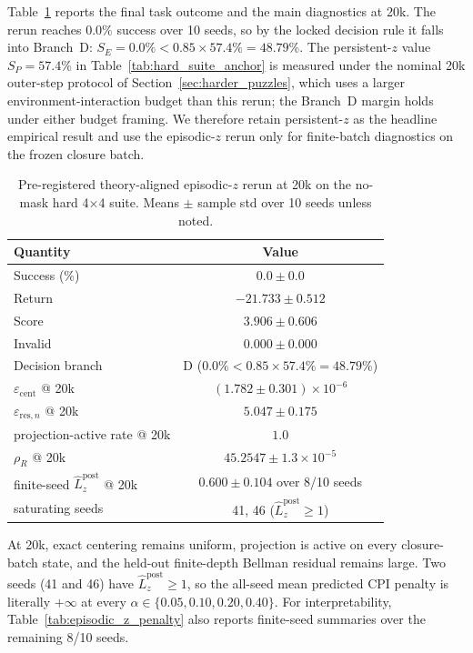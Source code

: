 \documentclass{article}
\theoremstyle{plain}
\theoremstyle{definition}
\theoremstyle{remark}
\begin{document}
Table~\ref{tab:episodic_z_branch_d} reports the final task outcome and the main diagnostics at 20k. The rerun reaches $0.0\%$ success over 10 seeds, so by the locked decision rule it falls into Branch~D: $S_E = 0.0\% < 0.85 \times 57.4\% = 48.79\%$. The persistent-$z$ value $S_P = 57.4\%$ in Table~\ref{tab:hard_suite_anchor} is measured under the nominal 20k outer-step protocol of Section~\ref{sec:harder_puzzles}, which uses a larger environment-interaction budget than this rerun; the Branch~D margin holds under either budget framing. We therefore retain persistent-$z$ as the headline empirical result and use the episodic-$z$ rerun only for finite-batch diagnostics on the frozen closure batch.

\begin{table}[t]
\caption{Pre-registered theory-aligned episodic-$z$ rerun at 20k on the no-mask hard 4$\times$4 suite. Means $\pm$ sample std over 10 seeds unless noted.}
\label{tab:episodic_z_branch_d}
\centering
\small
\begin{tabular}{@{}lc@{}}
\toprule
Quantity & Value \\
\midrule
Success (\%) & $0.0 \pm 0.0$ \\
Return & $-21.733 \pm 0.512$ \\
Score & $3.906 \pm 0.606$ \\
Invalid & $0.000 \pm 0.000$ \\
Decision branch & D ($0.0\% < 0.85 \times 57.4\% = 48.79\%$) \\
\midrule
$\varepsilon_{\mathrm{cent}}$ @ 20k & $(1.782 \pm 0.301)\times 10^{-6}$ \\
$\varepsilon_{\mathrm{res},n}$ @ 20k & $5.047 \pm 0.175$ \\
projection-active rate @ 20k & $1.0$ \\
$\rho_R$ @ 20k & $45.2547 \pm 1.3 \times 10^{-5}$ \\
finite-seed $\hat L_z^{\mathrm{post}}$ @ 20k & $0.600 \pm 0.104$ over 8/10 seeds \\
saturating seeds & 41, 46 ($\hat L_z^{\mathrm{post}}\ge 1$) \\
\bottomrule
\end{tabular}
\end{table}

At 20k, exact centering remains uniform, projection is active on every closure-batch state, and the held-out finite-depth Bellman residual remains large. Two seeds (41 and 46) have $\hat L_z^{\mathrm{post}}\ge 1$, so the all-seed mean predicted CPI penalty is literally $+\infty$ at every $\alpha \in \{0.05, 0.10, 0.20, 0.40\}$. For interpretability, Table~\ref{tab:episodic_z_penalty} also reports finite-seed summaries over the remaining 8/10 seeds.
\end{document}
